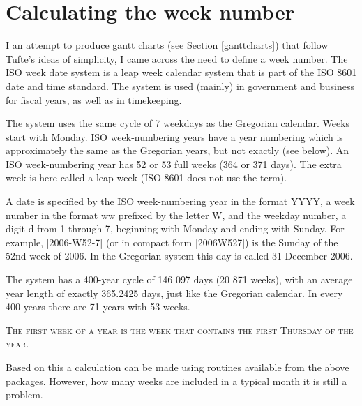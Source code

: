 \section*{Calculating the week number}

I an attempt to produce gantt charts (see Section \ref{ganttcharts}) that follow Tufte's ideas of simplicity, I came across the need to define a week number. The ISO week date system is a leap week calendar system that is part of the ISO 8601 date and time standard. The system is used (mainly) in government and business for fiscal years, as well as in timekeeping.

The system uses the same cycle of 7 weekdays as the Gregorian calendar. Weeks start with Monday. ISO week-numbering years have a year numbering which is approximately the same as the Gregorian years, but not exactly (see below). An ISO week-numbering year has 52 or 53 full weeks (364 or 371 days). The extra week is here called a leap week (ISO 8601 does not use the term).



A date is specified by the ISO week-numbering year in the format YYYY, a week number in the format ww prefixed by the letter W, and the weekday number, a digit d from 1 through 7, beginning with Monday and ending with Sunday. For example, |2006-W52-7| (or in compact form |2006W527|) is the Sunday of the 52nd week of 2006. In the Gregorian system this day is called 31 December 2006.

The system has a 400-year cycle of 146 097 days (20 871 weeks), with an average year length of exactly 365.2425 days, just like the Gregorian calendar. In every 400 years there are 71 years with 53 weeks.

\textsc{The first week of a year is the week that contains the first Thursday of the year.}

Based on this a calculation can be made using routines available from the above packages. However, how many weeks are included in a typical month it is still a problem.



